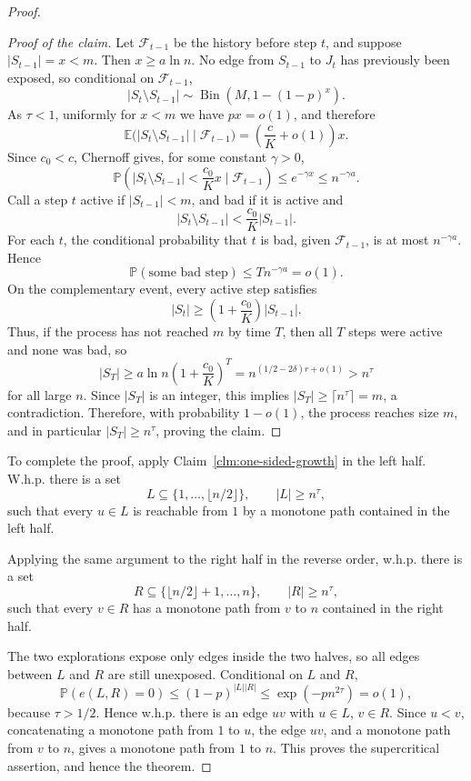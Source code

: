 \documentclass[fullpage,11pt]{article}
\newcommand{\PP}{\mathbb{P}}
\newcommand{\EE}{\mathbb{E}}
\theoremstyle{break}
\theoremstyle{definition}
\theoremstyle{break}
\begin{document}
\begin{proof}
\begin{proof}[Proof of the claim]
Let \(\mathcal F_{t-1}\) be the history before step \(t\), and suppose
\(|S_{t-1}|=x<m\). Then \(x\ge a\ln n\). No edge from \(S_{t-1}\) to \(J_t\)
has previously been exposed, so conditional on \(\mathcal F_{t-1}\),
\[
    |S_t\setminus S_{t-1}|
    \sim \operatorname{Bin}\left(M,1-(1-p)^x\right).
\]
As \(\tau<1\), uniformly for \(x<m\) we have \(px=o(1)\), and therefore
\[
    \EE\bigl(|S_t\setminus S_{t-1}|\mid \mathcal F_{t-1}\bigr)
    =\left(\frac{c}{K}+o(1)\right)x .
\]
Since \(c_0<c\), Chernoff gives, for some constant \(\gamma>0\),
\[
    \PP\left(|S_t\setminus S_{t-1}|<\frac{c_0}{K}x
    \mid \mathcal F_{t-1}\right)
    \le e^{-\gamma x}
    \le n^{-\gamma a}.
\]
Call a step \(t\) active if \(|S_{t-1}|<m\), and bad if it is active and
\[
    |S_t\setminus S_{t-1}|<\frac{c_0}{K}|S_{t-1}|.
\]
For each \(t\), the conditional probability that \(t\) is bad, given
\(\mathcal F_{t-1}\), is at most \(n^{-\gamma a}\). Hence
\[
    \PP(\text{some bad step})\le Tn^{-\gamma a}=o(1).
\]
On the complementary event, every active step satisfies
\[
    |S_t|\ge \left(1+\frac{c_0}{K}\right)|S_{t-1}|.
\]
Thus, if the process has not reached \(m\) by time \(T\), then all \(T\) steps
were active and none was bad, so
\[
    |S_T|
    \ge a\ln n\left(1+\frac{c_0}{K}\right)^T
    =n^{(1/2-2\delta)r+o(1)}
    > n^\tau
\]
for all large \(n\). Since \(|S_T|\) is an integer, this implies
\(|S_T|\ge \lceil n^\tau\rceil=m\), a contradiction. Therefore, with
probability \(1-o(1)\), the process reaches size \(m\), and in particular
\(|S_T|\ge n^\tau\), proving the claim.
\end{proof}

\noindent To complete the proof, apply Claim~\ref{clm:one-sided-growth} in the left
half. W.h.p. there is a set
\[
    L\subseteq \{1,\ldots,\lfloor n/2\rfloor\},
    \qquad |L|\ge n^\tau,
\]
such that every \(u\in L\) is reachable from \(1\) by a monotone path contained
in the left half.

Applying the same argument to the right half in the reverse order, w.h.p.
there is a set
\[
    R\subseteq \{\lfloor n/2\rfloor+1,\ldots,n\},
    \qquad |R|\ge n^\tau,
\]
such that every \(v\in R\) has a monotone path from \(v\) to \(n\) contained in
the right half.

The two explorations expose only edges inside the two halves, so all edges
between \(L\) and \(R\) are still unexposed. Conditional on \(L\) and \(R\),
\[
    \PP(e(L,R)=0)
    \le (1-p)^{|L||R|}
    \le \exp(-p n^{2\tau})
    =o(1),
\]
because \(\tau>1/2\). Hence w.h.p. there is an edge \(uv\) with
\(u\in L\), \(v\in R\). Since \(u<v\), concatenating a monotone path from
\(1\) to \(u\), the edge \(uv\), and a monotone path from \(v\) to \(n\), gives
a monotone path from \(1\) to \(n\). This proves the supercritical assertion,
and hence the theorem.
\end{proof}
\end{document}

